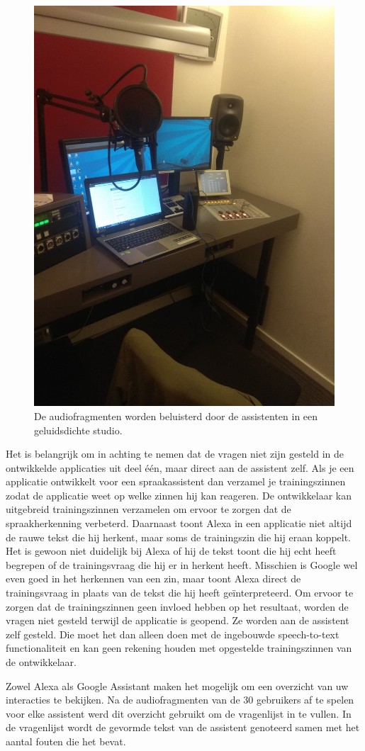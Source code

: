 \begin{figure}[h]
    \includegraphics[width=0.7\linewidth]{img/proefafname3}
    \caption{De audiofragmenten worden beluisterd door de assistenten in een geluidsdichte studio.}
    \label{fig:proefafname2}
\end{figure}

Het is belangrijk om in achting te nemen dat de vragen niet zijn gesteld in de ontwikkelde applicaties uit deel één, maar direct aan de assistent zelf. Als je een applicatie ontwikkelt voor een spraakassistent dan verzamel je trainingszinnen zodat de applicatie weet op welke zinnen hij kan reageren. De ontwikkelaar kan uitgebreid trainingszinnen verzamelen om ervoor te zorgen dat de spraakherkenning verbeterd. Daarnaast toont Alexa in een applicatie niet altijd de rauwe tekst die hij herkent, maar soms de trainingszin die hij eraan koppelt. Het is gewoon niet duidelijk bij Alexa of hij de tekst toont die hij echt heeft begrepen of de trainingsvraag die hij er in herkent heeft. Misschien is Google wel even goed in het herkennen van een zin, maar toont Alexa direct de trainingsvraag in plaats van de tekst die hij heeft geïnterpreteerd. Om ervoor te zorgen dat de trainingszinnen geen invloed hebben op het resultaat, worden de vragen niet gesteld terwijl de applicatie is geopend. Ze worden aan de assistent zelf gesteld. Die moet het dan alleen doen met de ingebouwde speech-to-text functionaliteit en kan geen rekening houden met opgestelde trainingszinnen van de ontwikkelaar.

Zowel Alexa als Google Assistant maken het mogelijk om een overzicht van uw interacties te bekijken. Na de audiofragmenten van de 30 gebruikers af te spelen voor elke assistent werd dit overzicht gebruikt om de vragenlijst in te vullen. In de vragenlijst wordt de gevormde tekst van de assistent genoteerd samen met het aantal fouten die het bevat.